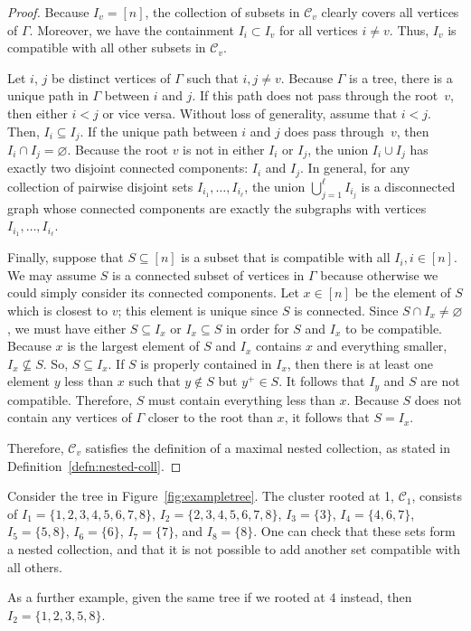 \documentclass[pdftex]{sigma}
\numberwithin{equation}{section}
\newcommand{\new}[1]{{#1}}
\newcommand{\calC}{\mathcal{C}}
\begin{document}
\begin{proof}
Because $I_v = [n]$, the collection of subsets in $\mathcal{C}_{v}$ clearly covers all vertices of $\Gamma$. Moreover, we have the containment $I_{i} \subset I_{v}$ for all vertices $i \neq v$. Thus, $I_v$ is compatible with all other subsets in $\mathcal{C}_{v}$.

Let $i$, $j$ be distinct vertices of $\Gamma$ such that $i,j \neq v$. Because $\Gamma$ is a tree, there is a unique path in $\Gamma$ between $i$ and $j$. If this path does not pass through the root~$v$, then either $i < j$ or vice versa. Without loss of generality, assume that $i < j$. Then, $I_i \subseteq I_j$. If the unique path between $i$ and $j$ does pass through~$v$, then $I_i \cap I_j = \varnothing$. Because the root $v$ is not in either $I_i$ or $I_j$, the union $I_{i} \cup I_{j}$ has exactly two disjoint connected components: $I_i$ and $I_j$. In general, for any collection of pairwise disjoint sets $I_{i_1}, \dots, I_{i_\ell}$, the union $\bigcup_{j=1}^\ell I_{i_j}$ is a disconnected graph whose connected components are exactly the subgraphs with vertices $I_{i_1}, \dots, I_{i_\ell}$.

Finally, suppose that $S \subseteq [n]$ is a subset that is compatible with all $I_i, i \in [n]$. We may assume $S$ is a connected subset of vertices in $\Gamma$ because otherwise we could simply consider its connected components. Let $x \in [n]$ be the element of $S$ which is closest to $v$; this element is unique since $S$ is connected. Since $S \cap I_x \neq \varnothing$, we must have either $S \subseteq I_x$ or $I_x \subseteq S$ in order for $S$ and $I_x$ to be compatible. Because $x$ is the largest element of $S$ and $I_x$ contains $x$ and everything smaller, $I_x\not\subseteq S$. So, $S \subseteq I_x$. If $S$ is properly contained in $I_x$, then there is at least \new{one} element $y$ less than $x$ such that $y \notin S$ but $y^+ \in S$. It follows that $I_y$ and $S$ are not compatible. Therefore, $S$ must contain everything less than $x$. Because $S$ does not contain any vertices of $\Gamma$ closer to the root than $x$, it follows that $S = I_x$.

Therefore, $\mathcal{C}_{v}$ satisfies the definition of a maximal nested collection, as stated in Defini\-tion~\ref{defn:nested-coll}.
\end{proof}

\begin{Example}\label{ex:rooted-cluster}
Consider the tree in Figure~\ref{fig:exampletree}. The cluster rooted at 1, $\calC_1$, consists of $I_1 = \{1,2,3,4,5,6,7,8\}$, $I_2 = \{2,3,4,5,6,7,8\}$, $I_3 = \{3\}$, $I_4 = \{4,6,7\}$, $I_5 = \{5,8\}$, $I_6 = \{6\}$, $I_7 = \{7\}$, and $I_8 = \{8\}$. One can check that these sets form a nested collection, and that it is not possible to add another set compatible with all others.

As a further example, given the same tree if we rooted at $4$ instead, then $I_2 = \{1,2,3,5,8\}$.
\end{Example}
\end{document}
